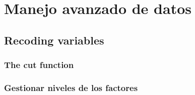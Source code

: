 \chapter{Manejo avanzado de datos}

\section{Recoding variables}\label{Recoding variables}

\subsection{The cut function}

\subsection{Gestionar niveles de los factores}\label{maipulate levels}
